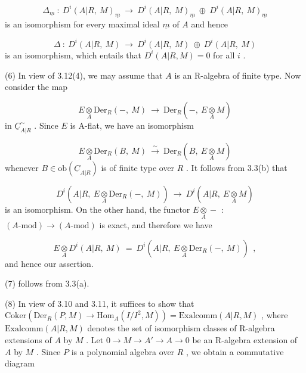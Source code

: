 \begin{equation*}
\Delta_{\underline{m}} \ : \ D^i(A|R, \ M)_{\underline{m}} \ \to \ D^i(A|R, \ M)_{\underline{m}} \ \oplus \ D^i(A|R, \ M)_{\underline{m}}
\end{equation*}
is an isomorphism for every maximal ideal  $\underline{m}$  of  $A$  and hence

\begin{equation*}
\Delta \ : \ D^i(A|R, \ M) \ \to \ D^i(A|R, \ M) \ \oplus \ D^i(A|R, \ M)
\end{equation*}
is an isomorphism, which entails that  $D^i(A|R, M) = 0$  for all  $i$  .

(6)  In view of 3.12(4), we may assume that  $A$  is an R-algebra of finite type. Now consider the map

\begin{equation*}
E \underset{A}{\otimes} \mathrm{Der}_R(-, \ M) \ \to \ \mathrm{Der}_R(-, \ E \underset{A}{\otimes} M)
\end{equation*}
in  $\underline{C}^{\sim}_{A|R}$  . Since  $E$  is A-flat, we have an isomorphism

\begin{equation*}
E \underset{A}{\otimes} \mathrm{Der}_R(B, \ M) \ \overset{\sim}{\longrightarrow} \ \mathrm{Der}_R(B, \ E \underset{A}{\otimes} M)
\end{equation*}
whenever  $B \in \mathrm{ob}(\underline{C}_{A|R})$  is of finite type over  $R$  . It follows from 3.3(b) that

\begin{equation*}
D^i(A|R, \ E \underset{A}{\otimes} \mathrm{Der}_R(-, \ M)) \ \to \ D^i(A|R, \ E \underset{A}{\otimes} M)
\end{equation*}
is an isomorphism. On the other hand, the functor  $E \underset{A}{\otimes} -$  :  $(A\text{-mod}) \to (A\text{-mod})$  is exact, and therefore we have

\begin{equation*}
E \underset{A}{\otimes} D^i(A|R, \ M) \ = \ D^i(A|R, \ E \underset{A}{\otimes} \mathrm{Der}_R(-, \ M)) \ \ ,
\end{equation*}
and hence our assertion.

(7)  follows from 3.3(a).



(8)  In view of 3.10 and 3.11, it suffices to show that $\mathrm{Coker}(\mathrm{Der}_R(P, M) \to \mathrm{Hom}_A(I/I^2, M)) = \mathrm{Exalcomm}(A|R, M)$ , where  $\mathrm{Exalcomm}(A|R, M)$ denotes the set of isomorphism classes of R-algebra extensions of  $A$  by  $M$ . Let $0 \to M \to A' \to A \to 0$   be an R-algebra extension of  $A$  by  $M$ . Since  $P$  is a polynomial algebra over  $R$ , we obtain a commutative diagram

